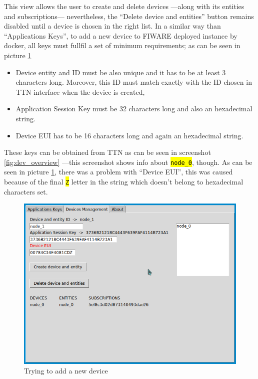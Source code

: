 \documentclass[11pt,a4paper,dvipsnames,twoside]{article}
\newcommand{\cmd}[1] {\hl{\texttt{#1}}}
\begin{document}
This view allows the user to create and delete devices ---along with its entities and subscriptions--- nevertheless, the \enquote{Delete device and entities} button remains disabled until a device is chosen in the right list. In a similar way than \enquote{Applications Keys}, to add a new device to FIWARE deployed instance by docker, all keys must fullfil a set of minimum requirements; as can be seen in picture \ref{fig:adding_dev}

\begin{itemize}
  \item Device entity and ID must be also unique and it has to be at least 3 characters long. Moreover, this ID must match exactly with the ID chosen in TTN interface when the device is created,
  \item Application Session Key must be 32 characters long and also an hexadecimal string.
  \item Device EUI has to be 16 characters long and again an hexadecimal string.
\end{itemize}

These keys can be obtained from TTN as can be seen in screenshot \ref{fig:dev_overview} ---this screenshot shows info about \cmd{node\_0}, though. As can be seen in picture \ref{fig:adding_dev}, there was a problem with \enquote{Device EUI}, this was caused because of the final \cmd{Z} letter in the string which doesn't belong to hexadecimal characters set.

\begin{figure}[htp]
  \centering
  \includegraphics[width=.9\textwidth]{../pictures/GUI_add_device.png}
  \caption{Trying to add a new device}
  \label{fig:adding_dev}
\end{figure}
\end{document}
